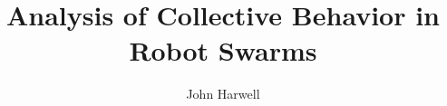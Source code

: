 

\phd %

%
\title{\bf Analysis of Collective Behavior in Robot Swarms}
\author{John Harwell}


\abstract{}

\copyrightpage       %

\acknowledgements{}
\dedication{}


\beforepreface

\figurespage
\tablespage

\afterpreface
